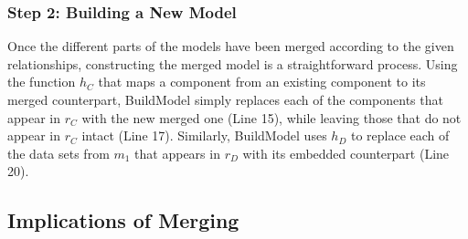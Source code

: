 
\subsubsection{Step 2: Building a New Model}

Once the different parts of the models have been merged according to
the given relationships, constructing the merged model is a
straightforward process. Using the function $h_{C}$ that maps a component
from an existing component to its merged counterpart, \textsf{BuildModel}
simply replaces each of the components that appear in $r_{C}$ with the
new merged one (Line 15), while leaving those that do not appear in
$r_{C}$ intact (Line 17). Similarly, \textsf{BuildModel} uses $h_{D}$
to replace each of the data sets from $m_{1}$ that appears in $r_{D}$
with its embedded counterpart (Line 20).  

\subsection{Implications of Merging}

